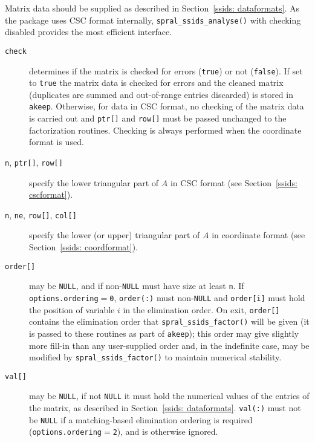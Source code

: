 \noindent
Matrix data should be supplied as described in Section~\ref{ssids: dataformats}. As
the package uses CSC format internally, \texttt{spral\_ssids\_analyse()} with checking
disabled provides the most efficient interface.

\noindent

\vspace*{-3mm}
\begin{description}

\item[\texttt{check}] determines if the matrix is checked for errors
   (\texttt{true}) or not (\texttt{false}). If set to {\tt true} the matrix
   data is checked for errors and the cleaned matrix (duplicates are summed and
   out-of-range entries discarded) is stored in {\tt akeep}.
   Otherwise, for data in CSC format, no checking of the matrix data is carried
   out and {\tt ptr[]} and {\tt row[]} must be passed unchanged to the
   factorization routines. 
   Checking is always performed when the coordinate format is used.

\item[\texttt{n}{\rm ,} \texttt{ptr[]}{\rm ,} \texttt{row[]}] specify the lower
   triangular part of $A$ in CSC format (see Section~\ref{ssids: cscformat}).

\item[\texttt{n}{\rm ,} \texttt{ne}{\rm ,} \texttt{row[]}{\rm ,} \texttt{col[]}]
   specify the lower (or upper) triangular part of $A$ in coordinate format
   (see Section~\ref{ssids: coordformat}).

\item[\texttt{order[]}] may be \texttt{NULL}, and if non-\texttt{NULL} must
   have size at least {\tt n}. If {\tt options.ordering}$=${\tt 0},
   {\tt order(:)} must non-\texttt{NULL} and {\tt order[i]} must hold the
   position of variable $i$ in the elimination order. On exit, {\tt order[]}
   contains the elimination order that {\tt spral\_ssids\_factor()} will be given (it
   is passed to these routines as part of {\tt *akeep}); this order may give
   slightly more fill-in than any user-supplied order and, in the indefinite
   case, may be modified by {\tt spral\_ssids\_factor()} to maintain numerical
   stability. 

\item[\texttt{val[]}] may be \texttt{NULL}, if not \texttt{NULL} it must hold
   the numerical values of the entries of the matrix, as described in
   Section~\ref{ssids: dataformats}.
   {\tt val(:)} must not be \texttt{NULL} if a matching-based elimination
   ordering is required ({\tt options.ordering$=$2}), and is otherwise ignored.


\end{description}
